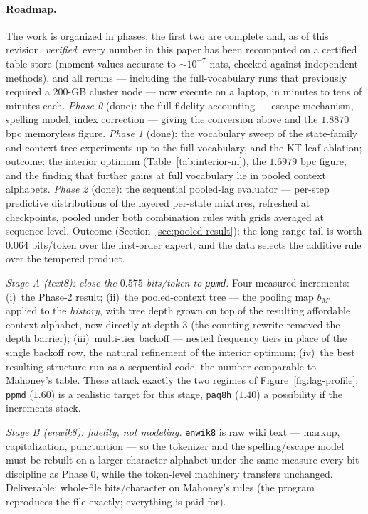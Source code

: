 \documentclass[11pt]{article}
\begin{document}
\paragraph{Roadmap.}
The work is organized in phases; the first two are complete and,
as of this revision, \emph{verified}: every number in this paper has
been recomputed on a certified table store (moment values accurate to
$\sim 10^{-7}$ nats, checked against independent methods), and all
reruns --- including the full-vocabulary runs that previously
required a 200-GB cluster node --- now execute on a laptop, in
minutes to tens of minutes each.  \emph{Phase 0} (done): the
full-fidelity accounting --- escape mechanism, spelling model, index
correction --- giving the conversion above and the $1.8870$ bpc
memoryless figure.  \emph{Phase 1} (done): the vocabulary sweep of
the state-family and context-tree experiments up to the full
vocabulary, and the KT-leaf ablation; outcome: the interior optimum
(Table~\ref{tab:interior-m}), the $1.6979$ bpc figure, and the
finding that further gains at full vocabulary lie in pooled context
alphabets.  \emph{Phase 2} (done): the sequential pooled-lag evaluator ---
per-step predictive distributions of the layered per-state mixtures,
refreshed at checkpoints, pooled under both combination rules with
grids averaged at sequence level.  Outcome
(Section~\ref{sec:pooled-result}): the long-range tail is worth
$0.064$ bits/token over the first-order expert, and the data selects
the additive rule over the tempered product.

\emph{Stage A (text8): close the $0.575$ bits/token to
\texttt{ppmd}.}  Four measured increments: (i)~the Phase-2 result;
(ii)~the pooled-context tree --- the pooling map $b_{M^\star}$
applied to the \emph{history}, with tree depth grown on top of the
resulting affordable context alphabet, now directly at depth $3$
(the counting rewrite removed the depth barrier); (iii)~multi-tier
backoff --- nested frequency tiers in place of the single backoff
row, the natural refinement of the interior optimum; (iv)~the best
resulting structure run as a sequential code, the number comparable
to Mahoney's table.  These attack exactly the two regimes of
Figure~\ref{fig:lag-profile}; \texttt{ppmd} ($1.60$) is a realistic
target for this stage, \texttt{paq8h} ($1.40$) a possibility if the
increments stack.

\emph{Stage B (enwik8): fidelity, not modeling.}  \texttt{enwik8} is
raw wiki text --- markup, capitalization, punctuation --- so the
tokenizer and the spelling/escape model must be rebuilt on a larger
character alphabet under the same measure-every-bit discipline as
Phase 0, while the token-level machinery transfers unchanged.
Deliverable: whole-file bits/character on Mahoney's rules (the
program reproduces the file exactly; everything is paid for).
\end{document}

